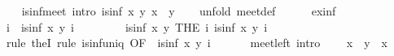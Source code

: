 \begin{isabellebody}
\isanewline
\ \ \isamarkupfalse%
\ is{}inf{}meet\ {}intro{}{}{}\ {}is{}inf\ x\ y\ {}x\ {}\ y{}{}\isanewline
\ \ \isamarkupfalse%
\ {}unfold\ meet{}def{}\isanewline
\ \ \ \ \isamarkupfalse%
\ ex{}inf\ \isamarkupfalse%
\ i\ \ {}is{}inf\ x\ y\ i{}\ \isamarkupfalse%
\isanewline
\ \ \ \ \isamarkupfalse%
\ \isamarkupfalse%
\ {}is{}inf\ x\ y\ {}THE\ i{}\ is{}inf\ x\ y\ i{}{}\isanewline
\ \ \ \ \ \ \isamarkupfalse%
\ {}rule\ theI{}\ {}rule\ is{}inf{}uniq\ {}OF\ {}\ {}is{}inf\ x\ y\ i{}{}{}\isanewline
\ \ \isamarkupfalse%
\isanewline
\isanewline
\ \ \isamarkupfalse%
\ meet{}left\ {}intro{}{}{}\isanewline
\ \ \ \ {}x\ {}\ y\ {}\ x{}\isanewline

\end{isabellebody}
